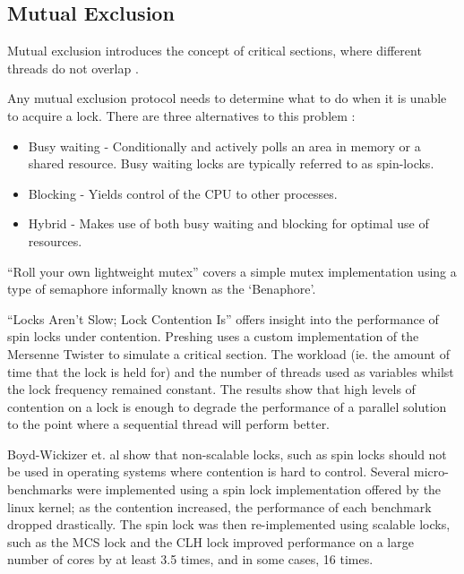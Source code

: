 \documentclass[a4paper, 12pt, titlepage]{article}
\begin{document}
\begin{onehalfspacing}
\subsection{Mutual Exclusion}
Mutual exclusion introduces the concept of critical sections, where different threads do not overlap \cite[Chapter~2]{herlihy2020art}. 

Any mutual exclusion protocol needs to determine what to do when it is unable to acquire a lock. There are three alternatives to this problem \cite[Chapter~7]{herlihy2020art}:
\begin{itemize}
  \item Busy waiting - Conditionally and actively polls an area in memory or a shared resource. Busy waiting locks are typically referred to as spin-locks.
  \item Blocking - Yields control of the CPU to other processes.
  \item Hybrid - Makes use of both busy waiting and blocking for optimal use of resources.
\end{itemize}

``Roll your own lightweight mutex''\cite{preshingmutex} covers a simple mutex implementation using a type of semaphore informally known as the `Benaphore'\cite{haikubenaphore}.

``Locks Aren't Slow; Lock Contention Is''\cite{preshinglockcontentionslow} offers insight into the performance of spin locks under contention. Preshing uses a custom implementation of the Mersenne Twister \cite{matsumoto1998mersenne} to simulate a critical section. The workload (ie. the amount of time that the lock is held for) and the number of threads used as variables whilst the lock frequency remained constant. The results show that high levels of contention on a lock is enough to degrade the performance of a parallel solution to the point where a sequential thread will perform better.

Boyd-Wickizer et. al show that non-scalable locks, such as spin locks should not be used in operating systems where contention is hard to control. Several micro-benchmarks were implemented using a spin lock implementation offered by the linux kernel; as the contention increased, the performance of each benchmark dropped drastically. The spin lock was then re-implemented using scalable locks, such as the MCS lock \cite{mellor1991algorithms} and the CLH lock \cite{craig1993building,magnusson1994queue} improved performance on a large number of cores by at least 3.5 times, and in some cases, 16 times.


\end{onehalfspacing}
\end{document}

